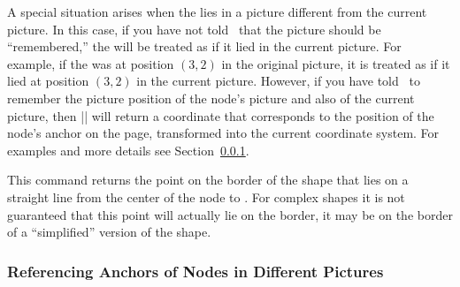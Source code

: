 \begin{command}{\pgfpointanchor{}}
\begin{codeexample}[]
\begin{pgfpicture}
  {
    \pgftransformreset
    \xdef\mycoordinate{\noexpand\pgfpoint{\the\pgf@x}{\the\pgf@y}}
  }

  \pgfpathcircle{\mycoordinate}{2pt}
\end{pgfpicture}
\end{codeexample}

  A special situation arises when the  lies in a picture
  different from the current picture. In this case, if you have not
  told \pgfname\ that the picture should be ``remembered,'' the
   will be treated as if it lied in the current
  picture. For example, if the  was at position $(3,2)$ in
  the original picture, it is treated as if it lied at position
  $(3,2)$ in the current picture. However, if you have told \pgfname\
  to remember the picture position of the node's picture and also of
  the current picture,
  then |\pgfpointanchor| will return a coordinate that corresponds to
  the position of the node's anchor on the page, transformed into the
  current coordinate system. For examples and more details see
  Section~\ref{section-cross-pictures-pgf}.
\end{command}

\begin{command}{\pgfpointshapeborder{}}
  This command returns the point on the border of the shape that lies
  on a straight line from the center of the node to \meta{point}. For
  complex shapes it is not guaranteed that this point will actually
  lie on the border, it may be on the border of a ``simplified''
  version of the shape.

\begin{codeexample}[]
\begin{pgfpicture}
  \begin{pgfscope}
  \end{pgfscope}
  \pgfpathcircle{\pgfpoint{2cm}{1cm}}{2pt}
  \pgfpathcircle{\pgfpoint{-1cm}{1cm}}{2pt}
\end{pgfpicture}
\end{codeexample}
\end{command}


\subsubsection{Referencing Anchors of Nodes in Different Pictures}
\label{section-cross-pictures-pgf}

